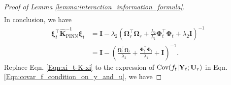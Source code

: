 \begin{proof}[Proof of Lemma \ref{lemma:interaction_information_formula}]
\begin{align*}
    \end{align*}
In conclusion, we have 
\begin{align}
        \boldsymbol{\xi}_t^\top \mathbf{\widehat{K}}_\mathrm{PINN}^{-1} \boldsymbol{\xi}_t &= \mathbf{I} - \lambda_2 \left(\boldsymbol{\Omega}_r^\top\boldsymbol{\Omega}_r+\frac{\lambda_2} {\lambda_1} \boldsymbol{\Phi}_t^\top \boldsymbol{\Phi}_t+ \lambda_2 \mathbf{I}\right)^{-1} \nonumber
        \\
        &= \mathbf{I} -  \left(\frac{\boldsymbol{\Omega}_r^\top\boldsymbol{\Omega}_r}{\lambda_2}+\frac{\boldsymbol{\Phi}_t^\top \boldsymbol{\Phi}_t} {\lambda_1} + \mathbf{I}\right)^{-1}. \label{Eqn:xi_t-K-xi} 
\end{align}
Replace Eqn. \ref{Eqn:xi_t-K-xi} to the expression of $\textup{Cov}(f_t \rvert \mathbf{Y}_t; \mathbf{U}_r)$ in Eqn. \ref{Eqn:covar_f_condition_on_y_and_u}, we have 


\end{proof}

